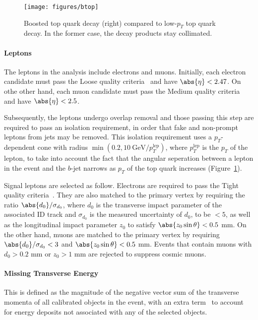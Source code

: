 \begin{figure}[H]
	\texttt{[image: figures/btop]}
	\centering

	\caption{Boosted top quark decay (right) compared to low-$p_T$ top quark
		decay. In the former case, the decay products stay collimated.}

	\label{f:boostedtop}
\end{figure}


\paragraph{Leptons} The leptons in the analysis include electrons and muons.
Initially, each electron candidate must pass the Loose quality
criteria~\cite{PERF-2013-05,ATLAS-CONF-2016-024} and have $\abs{\eta} < 2.47$.
On othe other hand, each muon candidate must pass the Medium quality
criteria~\cite{PERF-2015-10} and have $\abs{\eta} < 2.5$.

Subsequently, the leptons undergo overlap removal and those passing this step
are required to pass an isolation requirement, in order that fake and
non-prompt leptons from jets may be removed. This isolation requirement uses a
$p_T$-dependent cone with radius $\min(0.2, 10~\text{GeV} / p_T^{\text{lep}})$,
where $p_T^{\text{lep}}$ is the $p_T$ of the lepton, to take into account the
fact that the angular seperation between a lepton in the event and the $b$-jet
narrows as $p_T$ of the top quark increases (Figure~\ref{f:boostedtop}).

Signal leptons are selected as follow. Electrons are required to pass the Tight
quality criteria~\cite{PERF-2013-05,ATLAS-CONF-2016-024}. They are also matched
to the primary vertex by requiring the ratio $\abs{d_0} /\sigma_{d_0}$, where
$d_0$ is the transverse impact parameter of the associated ID track and
$\sigma_{d_0}$ is the measured uncertainty of $d_0$, to be $<5$, as well as the
longitudinal impact parameter $z_0$ to satisfy $\abs{z_0\sin\theta} < 0.5$ mm.
On the other hand, muons are matched to the primary vertex by requiring
$\abs{d_0} /\sigma_{d_0} < 3$ and $\abs{z_0\sin\theta} < 0.5$ mm. Events that
contain muons with $d_0 > 0.2$ mm or $z_0 > 1$ mm are rejected to suppress
cosmic muons.

\paragraph{Missing Transverse Energy} This is defined as the magnitude of the
negative vector sum of the transverse momenta of all calibrated objects in the
event, with an extra term~\cite{ATL-PHYS-PUB-2015-027,ATL-PHYS-PUB-2015-023} to
account for energy deposits not associated with any of the selected objects.


